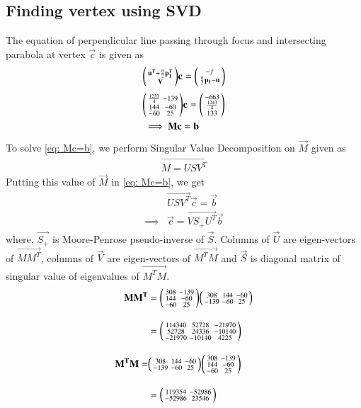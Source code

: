 \documentclass[journal,12pt,twocolumn]{IEEEtran}
\begin{document}
\subsection{Finding vertex using SVD}
The equation of perpendicular line passing through focus and intersecting parabola at vertex $\vec c$ is given as
\begin{align}
	\begin{psmallmatrix}\mathbf{u^T}+\frac{\eta}{2}\mathbf{p_1^T} \\ \mathbf{V}\end{psmallmatrix}\mathbf{c}=\begin{psmallmatrix}-f \\ \frac{\eta}{2}\mathbf{p_1}-\mathbf{u}\end{psmallmatrix} 
\end{align}
\begin{align}
	&\begin{psmallmatrix}\frac{1233}{4} & -139\\144 & -60\\-60 & 25\end{psmallmatrix}\mathbf c = \begin{psmallmatrix}-663\\\frac{1243}{4}\\133\end{psmallmatrix}\\
	&\implies \mathbf M \mathbf c= \mathbf b\label{eq: Mc=b}
\end{align}
To solve \eqref{eq: Mc=b}, we perform Singular Value Decomposition on $\vec{M}$ given as 
\begin{align}
	\vec{M = USV^T }\label{eq: SVD}
\end{align}
Putting this value of $\vec{M}$ in \eqref{eq: Mc=b}, we get
\begin{align}
	&\vec{USV^T}\vec{c} = \vec{b} \\
	\implies& \vec{c} = \vec{VS_+U^T}\vec{b}\label{eq: c}
\end{align}
where, $\vec{S_+}$ is Moore-Penrose pseudo-inverse of $\vec{S}$. Columns of $\vec{U}$ are eigen-vectors of $\vec{MM^T}$, columns of $\vec{V}$ are eigen-vectors of $\vec{M^TM}$ and $\vec{S}$ is diagonal matrix of singular value of eigenvalues of $\vec{M^TM}$.
\begin{align}
	\mathbf {MM^T} &= \begin{psmallmatrix}308 & -139\\144 & -60\\ -60 & 25\end{psmallmatrix} \begin{psmallmatrix}308 & 144 & -60\\ -139 & -60 & 25\end{psmallmatrix}\\[1em]
	& = \begin{psmallmatrix}114340 & 52728 & -21970\\ 52728 & 24336 & -10140\\-21970 & -10140 & 4225\end{psmallmatrix}\\[1em]
	\mathbf{M^TM}=& \begin{psmallmatrix}308 & 144 & -60\\ -139 & -60 & 25\end{psmallmatrix} \begin{psmallmatrix}308 & -139\\144 & -60\\ -60 & 25\end{psmallmatrix}\\[1em]
	&= \begin{psmallmatrix}119354 & -52986\\ -52986 & 23546\end{psmallmatrix}
\end{align}
\end{document}
